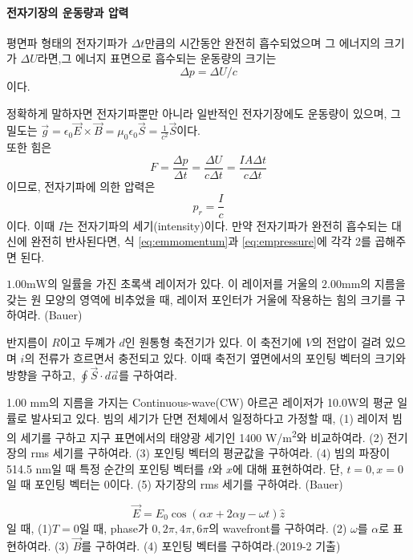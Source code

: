 \paragraph{전자기장의 운동량과 압력}
\begin{theorem}
평면파 형태의 전자기파가 $\Delta t$만큼의 시간동안 완전히 흡수되었으며 그 에너지의 크기가 $\Delta U$라면,그 에너지 표면으로 흡수되는 운동량의 크기는
\begin{equation}\label{eq:emmomentum}
\Delta p = \Delta U /c
\end{equation}
이다.
\end{theorem}
정확하게 말하자면 전자기파뿐만 아니라 일반적인 전자기장에도 운동량이 있으며, 그 밀도는 $\vec{g}=\epsilon_0 \vec{E}\times \vec{B}=\mu_0\epsilon_0 \vec{S}=\frac{1}{c^2}\vec{S}$이다.\\
또한 힘은
\begin{equation}
F=\frac{\Delta p}{\Delta t}=\frac{\Delta U}{c\Delta t}=\frac{IA\Delta t}{c\Delta t}
\end{equation}
이므로, 전자기파에 의한 압력은
\begin{equation}\label{eq:empressure}
p_r=\frac{I}{c}
\end{equation}
이다. 이때 $I$는 전자기파의 세기(intensity)이다. 만약 전자기파가 완전히 흡수되는 대신에 완전히 반사된다면, 식 \ref{eq:emmomentum}과 \ref{eq:empressure}에 각각 2를 곱해주면 된다.

\begin{exercise}
$1.00\mathrm{mW}$의 일률을 가진 초록색 레이저가 있다. 이 레이저를 거울의 $2.00\mathrm{mm}$의 지름을 갖는 원 모양의 영역에 비추었을 때, 레이저 포인터가 거울에 작용하는 힘의 크기를 구하여라. (Bauer)
\end{exercise}

\begin{problem}
반지름이 $R$이고 두꼐가 $d$인 원통형 축전기가 있다. 이 축전기에 $V$의 전압이 걸려 있으며 $i$의 전류가 흐르면서 충전되고 있다. 이때 축전기 옆면에서의 포인팅 벡터의 크기와 방향을 구하고, $\oint \vec{S}\cdot d\vec{a}$를 구하여라.
\end{problem}

\begin{problem}
1.00 mm의 지름을 가지는 Continuous-wave(CW) 아르곤 레이저가 10.0W의 평균 일률로 발사되고 있다. 빔의 세기가 단면 전체에서 일정하다고 가정할 때, (1) 레이저 빔의 세기를 구하고 지구 표면에서의 태양광 세기인 1400 W/m\textsuperscript{2}와 비교하여라. (2) 전기장의 rms 세기를 구하여라. (3) 포인팅 벡터의 평균값을 구하여라. (4) 빔의 파장이 514.5 nm일 때 특정 순간의 포인팅 벡터를 $t$와 $x$에 대해 표현하여라. 단, $t=0, x=0$일 때 포인팅 벡터는 0이다. (5) 자기장의 rms 세기를 구하여라. (Bauer) 
\end{problem}
\begin{problem}
\begin{equation}
\vec{E}=E_0\cos(\alpha x+2\alpha y-\omega t)\hat{z}
\end{equation}
일 때,
(1)$T=0$일 때, phase가 $0, 2\pi, 4\pi, 6\pi$의 wavefront를 구하여라.
(2)	$\omega$를 $\alpha$로 표현하여라.
(3)	$\vec{B}$를 구하여라.
(4)	포인팅 벡터를 구하여라.(2019-2 기출)
\end{problem}


